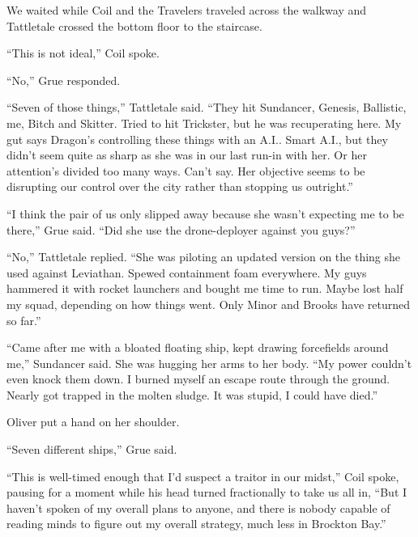 We waited while Coil and the Travelers traveled across the walkway and Tattletale crossed the bottom floor to the staircase.



``This is not ideal,'' Coil spoke.



``No,'' Grue responded.



``Seven of those things,'' Tattletale said.  ``They hit Sundancer, Genesis, Ballistic, me, Bitch and Skitter.  Tried to hit Trickster, but he was recuperating here.  My gut says Dragon's controlling these things with an A.I..  Smart A.I., but they didn't seem quite as sharp as she was in our last run-in with her.  Or her attention's divided too many ways.  Can't say.  Her objective seems to be disrupting our control over the city rather than stopping us outright.''



``I think the pair of us only slipped away because she wasn't expecting me to be there,'' Grue said.  ``Did she use the drone-deployer against you guys?''



``No,'' Tattletale replied.  ``She was piloting an updated version on the thing she used against Leviathan.  Spewed containment foam everywhere.  My guys hammered it with rocket launchers and bought me time to run.  Maybe lost half my squad, depending on how things went.  Only Minor and Brooks have returned so far.''



``Came after me with a bloated floating ship, kept drawing forcefields around me,'' Sundancer said.  She was hugging her arms to her body.  ``My power couldn't even knock them down.  I burned myself an escape route through the ground.  Nearly got trapped in the molten sludge.  It was stupid, I could have died.''



Oliver put a hand on her shoulder.



``Seven different ships,'' Grue said.



``This is well-timed enough that I'd suspect a traitor in our midst,'' Coil spoke, pausing for a moment while his head turned fractionally to take us all in, ``But I haven't spoken of my overall plans to anyone, and there is nobody capable of reading minds to figure out my overall strategy, much less in Brockton Bay.''



